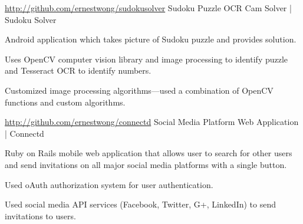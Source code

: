 

\begin{cventries}


  \cventry
    {\href{http://github.com/ernestwong/sudokusolver}{http://github.com/ernestwong/sudokusolver}} %
    {Sudoku Puzzle OCR Cam Solver | Sudoku Solver} %
    {} %
    {} %
    {
      \begin{cvitems} %
      \item {Android application which takes picture of Sudoku puzzle and provides solution.}
      \item {Uses OpenCV computer vision library and image processing to identify puzzle and Tesseract OCR to identify numbers.}
      \item {Customized image processing algorithms—used a combination of OpenCV functions and custom algorithms.}
      \end{cvitems}
    }

  \cventry
    {\href{http://github.com/ernestwong/connectd}{http://github.com/ernestwong/connectd}} %
    { Social Media Platform Web Application | Connectd } %
    {} %
    {} %
    {
      \begin{cvitems} %
      \item {Ruby on Rails mobile web application that allows user to search for other users and send invitations on all major social media platforms with a single button.}
      \item {Used oAuth authorization system for user authentication.}
      \item {Used social media API services (Facebook, Twitter, G+, LinkedIn) to send invitations to users.}
      \end{cvitems}
    }


\end{cventries}
